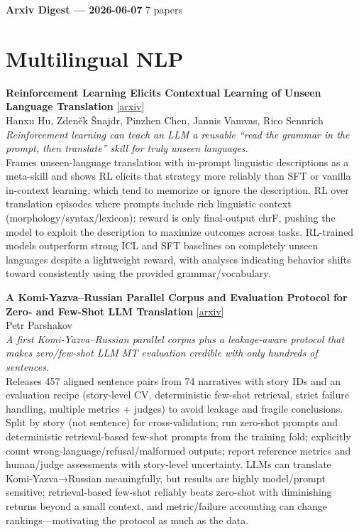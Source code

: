 \documentclass[12pt,letterpaper]{article}
\begin{document}
{\footnotesize\textbf{Arxiv Digest --- 2026-06-07} \hfill 7 papers}

\smallskip

\section*{Multilingual NLP}

{\small\textbf{Reinforcement Learning Elicits Contextual Learning of Unseen Language Translation}} {\scriptsize[\href{https://arxiv.org/abs/2606.06428}{arxiv}]}\\
{\scriptsize Hanxu Hu, Zdeněk Šnajdr, Pinzhen Chen, Jannis Vamvas, Rico Sennrich}\\

{\small\textit{Reinforcement learning can teach an LLM a reusable ``read the grammar in the prompt, then translate'' skill for truly unseen languages.}}\\[1pt]
{\footnotesize Frames unseen-language translation with in-prompt linguistic descriptions as a meta-skill and shows RL elicits that strategy more reliably than SFT or vanilla in-context learning, which tend to memorize or ignore the description. RL over translation episodes where prompts include rich linguistic context (morphology/syntax/lexicon); reward is only final-output chrF, pushing the model to exploit the description to maximize outcomes across tasks. RL-trained models outperform strong ICL and SFT baselines on completely unseen languages despite a lightweight reward, with analyses indicating behavior shifts toward consistently using the provided grammar/vocabulary.}

\medskip

{\small\textbf{A Komi-Yazva--Russian Parallel Corpus and Evaluation Protocol for Zero- and Few-Shot LLM Translation}} {\scriptsize[\href{https://arxiv.org/abs/2606.06420}{arxiv}]}\\
{\scriptsize Petr Parshakov}\\

{\small\textit{A first Komi‑Yazva--Russian parallel corpus plus a leakage-aware protocol that makes zero/few-shot LLM MT evaluation credible with only hundreds of sentences.}}\\[1pt]
{\footnotesize Releases 457 aligned sentence pairs from 74 narratives with story IDs and an evaluation recipe (story-level CV, deterministic few-shot retrieval, strict failure handling, multiple metrics + judges) to avoid leakage and fragile conclusions. Split by story (not sentence) for cross-validation; run zero-shot prompts and deterministic retrieval-based few-shot prompts from the training fold; explicitly count wrong-language/refusal/malformed outputs; report reference metrics and human/judge assessments with story-level uncertainty. LLMs can translate Komi‑Yazva→Russian meaningfully, but results are highly model/prompt sensitive; retrieval-based few-shot reliably beats zero-shot with diminishing returns beyond a small context, and metric/failure accounting can change rankings---motivating the protocol as much as the data.}
\end{document}
